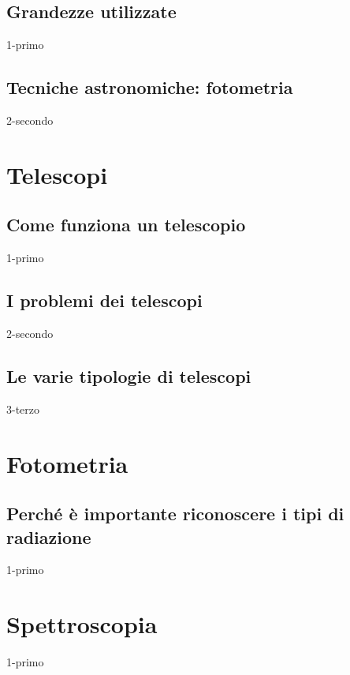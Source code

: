 \documentclass[openany,12pt]{article}
\begin{document}
    \subsection{Grandezze utilizzate}
    {1-primo}

    \subsection{Tecniche astronomiche: fotometria}
    {2-secondo}

  \newpage

  \section{Telescopi}

    \subsection{Come funziona un telescopio}
    {1-primo}

    \subsection{I problemi dei telescopi}
    {2-secondo}

    \subsection{Le varie tipologie di telescopi}
    {3-terzo}

  \newpage

  \section{Fotometria}

    \subsection{Perché è importante riconoscere i tipi di radiazione}
    {1-primo}

  \newpage

  \section{Spettroscopia}
    {1-primo}
\end{document}
